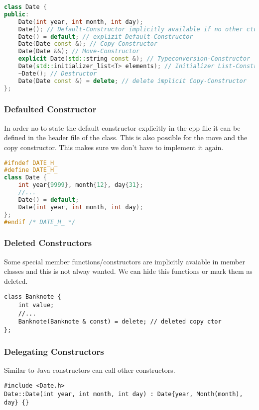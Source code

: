 \begin{lstlisting}[language=C++]
class Date {
public:
    Date(int year, int month, int day);
    Date(); // Default-Constructor implicitly available if no other ctor
    Date() = default; // explizit Default-Constructor
    Date(Date const &); // Copy-Constructor
    Date(Date &&); // Move-Constructor
    explicit Date(std::string const &); // Typeconversion-Constructor
    Date(std::initializer_list<T> elements); // Initializer List-Constructor
    ~Date(); // Destructor
    Date(Date const &) = delete; // delete implicit Copy-Constructor
};
\end{lstlisting}

\subsubsection{Defaulted Constructor}
In order no to state the default constructor explicitly in the cpp file it can be defined in the header file of the class. This is also possible for the move and the copy constructor. This makes sure we don't have to implement it again.
\begin{lstlisting}[language=C++]
#ifndef DATE_H_
#define DATE_H_
class Date {
	int year{9999}, month{12}, day{31};
	//...
	Date() = default;
	Date(int year, int month, int day);
};
#endif /* DATE_H_ */
\end{lstlisting}

\subsubsection{Deleted Constructors}
Some special member functions/constructors are implicitly avaiable in member classes and this is not alway wanted. We can hide this functions or mark them as deleted.

\begin{lstlisting}
class Banknote {
	int value;
	//...
	Banknote(Banknote & const) = delete; // deleted copy ctor
};
\end{lstlisting}

\subsubsection{Delegating Constructors}
Similar to Java constructors can call other constructors. 
\begin{lstlisting}
#include <Date.h>
Date::Date(int year, int month, int day) : Date{year, Month(month), day} {}
\end{lstlisting}

